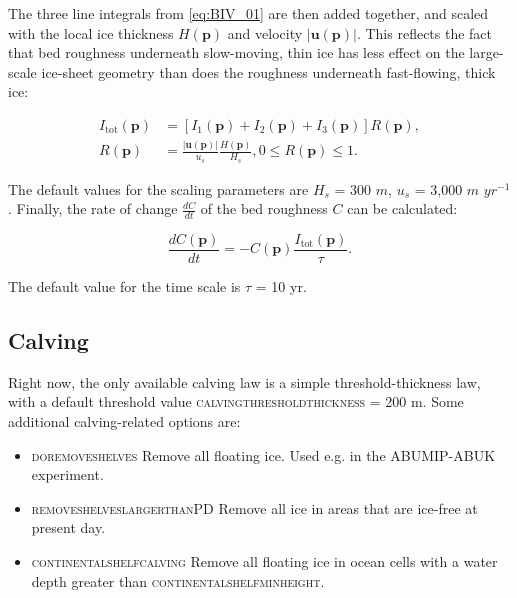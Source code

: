 \documentclass{article}
\begin{document}
The three line integrals from \eqref{eq:BIV_01} are then added together, and scaled with the local ice thickness $H \left( \textbf{p} \right)$ and velocity $\left| \textbf{u} \left( \textbf{p} \right) \right|$. This reflects the fact that bed roughness underneath slow-moving, thin ice has less effect on the large-scale ice-sheet geometry than does the roughness underneath fast-flowing, thick ice:

\begin{align}
I_{\textrm{tot}} \left( \textbf{p} \right) &= \left[
I_1 \left( \textbf{p} \right) + I_2 \left( \textbf{p} \right) + I_3 \left( \textbf{p} \right)
\right] R \left( \textbf{p} \right), \\
R \left( \textbf{p} \right) &=
\frac{ \left| \textbf{u} \left( \textbf{p} \right) \right| }{u_s}
\frac{ H \left( \textbf{p} \right) }{H_s}, 0 \leq R \left( \textbf{p} \right) \leq 1.
\end{align}

The default values for the scaling parameters are $H_s$ = 300 $m$, $u_s$ = 3,000 $m$ $yr^{-1}$. Finally, the rate of change $\frac{dC}{dt}$ of the bed roughness $C$ can be calculated:

\begin{equation}
\frac{ dC \left( \textbf{p} \right) }{dt} = -C \left( \textbf{p} \right) \frac{I_{\textrm{tot}} \left( \textbf{p} \right)}{\tau}.
\end{equation}

The default value for the time scale is $\tau$ = 10 yr.

\newpage
\subsection{Calving}

Right now, the only available calving law is a simple threshold-thickness law, with a default threshold value \textsc{calving\textunderscore threshold\textunderscore thickness} = 200 m. Some additional calving-related options are:

\begin{itemize}
\item \textsc{do\textunderscore remove\textunderscore shelves} Remove all floating ice. Used e.g. in the ABUMIP-ABUK experiment.
\item \textsc{remove\textunderscore shelves\textunderscore larger\textunderscore than\textunderscore PD} Remove all ice in areas that are ice-free at present day.
\item \textsc{continental\textunderscore shelf\textunderscore calving} Remove all floating ice in ocean cells with a water depth greater than \textsc{continental\textunderscore shelf\textunderscore min\textunderscore height}.
\end{itemize}
\end{document}
